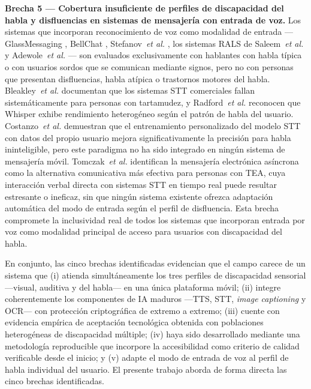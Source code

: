 \documentclass[journal]{IEEEtran}
\begin{document}
	\textbf{Brecha 5 --- Cobertura insuficiente de perfiles de discapacidad del habla y disfluencias en sistemas de mensajer\'ia con entrada de voz.} Los sistemas que incorporan reconocimiento de voz como modalidad de entrada ---GlassMessaging \cite{janaka2023}, BellChat \cite{guerrero2021bellchat}, Stefanov~\textit{et al.} \cite{stefanov2024}, los sistemas RALS de Saleem~\textit{et al.} \cite{saleem2023} y Adewole~\textit{et al.} \cite{papatsimouli2023}--- son evaluados exclusivamente con hablantes con habla t\'ipica o con usuarios sordos que se comunican mediante signos, pero no con personas que presentan disfluencias, habla at\'ipica o trastornos motores del habla. Bleakley~\textit{et al.} \cite{bleakley2022} documentan que los sistemas STT comerciales fallan sistem\'aticamente para personas con tartamudez, y Radford~\textit{et al.} \cite{radford2023} reconocen que Whisper exhibe rendimiento heterog\'eneo seg\'un el patr\'on de habla del usuario. Costanzo~\textit{et al.} \cite{costanzo2023} demuestran que el entrenamiento personalizado del modelo STT con datos del propio usuario mejora significativamente la precisi\'on para habla ininteligible, pero este paradigma no ha sido integrado en ning\'un sistema de mensajer\'ia m\'ovil. Tomczak~\textit{et al.} \cite{tomczak2021} identifican la mensajer\'ia electr\'onica as\'incrona como la alternativa comunicativa m\'as efectiva para personas con TEA, cuya interacci\'on verbal directa con sistemas STT en tiempo real puede resultar estresante o ineficaz, sin que ning\'un sistema existente ofrezca adaptaci\'on autom\'atica del modo de entrada seg\'un el perfil de disfluencia. Esta brecha compromete la inclusividad real de todos los sistemas que incorporan entrada por voz como modalidad principal de acceso para usuarios con discapacidad del habla.
	
	En conjunto, las cinco brechas identificadas evidencian que el campo carece de un sistema que (i) atienda simult\'aneamente los tres perfiles de discapacidad sensorial ---visual, auditiva y del habla--- en una \'unica plataforma m\'ovil; (ii) integre coherentemente los componentes de IA maduros ---TTS, STT, \textit{image captioning} y OCR--- con protecci\'on criptogr\'afica de extremo a extremo; (iii) cuente con evidencia emp\'irica de aceptaci\'on tecnol\'ogica obtenida con poblaciones heterog\'eneas de discapacidad m\'ultiple; (iv) haya sido desarrollado mediante una metodolog\'ia reproducible que incorpore la accesibilidad como criterio de calidad verificable desde el inicio; y (v) adapte el modo de entrada de voz al perfil de habla individual del usuario. El presente trabajo aborda de forma directa las cinco brechas identificadas.
	
\end{document}
